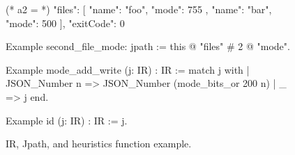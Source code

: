 \begin{figure}
  \begin{minipage}{.4\textwidth}
\begin{json}
  (* a2 = *)
  {
    "files": [
      {
        "name": "foo",
        "mode": 755
      },
      {
        "name": "bar",
        "mode": 500
      }
    ],
    "exitCode": 0
  }
\end{json}
  \end{minipage}\begin{minipage}{.5\textwidth}
\begin{coq}
Example second_file_mode: jpath :=
  this @ "files" # 2 @ "mode".

Example mode_add_write (j: IR) : IR :=
  match j with
  | JSON_Number n =>
    JSON_Number (mode_bits_or 200 n)
  | _ => j
  end.

Example id (j: IR) : IR := j.  
\end{coq}
  \end{minipage}
  \caption{IR, Jpath, and heuristics function example.}
  \label{fig:ir-jpath}
\end{figure}

